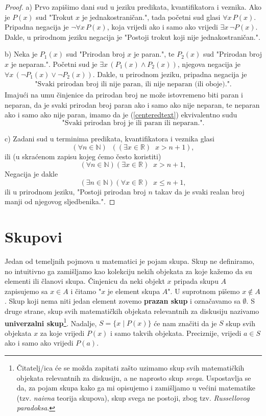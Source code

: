 \begin{proof}
a) Prvo zapišimo dani sud u jeziku predikata, kvantifikatora i veznika. Ako je \(P(x)\) sud "Trokut \(x\) je jednakostraničan.", tada početni sud glasi \(\forall{x}\, P(x)\). Pripadna negacija je \(\neg \forall{x}\, P(x)\), koja vrijedi ako i samo ako vrijedi $\exists{x}\,\neg P(x)$.
Dakle, u prirodnom jeziku negacija je "Postoji trokut koji nije jednakostraničan.".

b) Neka je \(P_1(x)\) sud "Prirodan broj \(x\) je paran.", te \(P_2(x)\) sud "Prirodan broj \(x\) je neparan.". Početni sud je \(\exists{x}\, \left(P_1(x)\wedge P_2(x)\right)\), njegova negacija je \(\forall{x}\, \left(\neg P_1(x)\vee \neg P_2(x)\right)\). Dakle, u prirodnom jeziku, pripadna negacija je
\begin{align}
\label{centeredtext}
\text{"Svaki prirodan broj ili nije paran, ili nije neparan (ili oboje).".}
\end{align}
Imajući na umu činjenice da prirodan broj ne može istovremeno biti paran i neparan, da je svaki prirodan broj paran ako i samo ako nije neparan, te neparan ako i samo ako nije paran, imamo da je (\ref{centeredtext}) ekvivalentno sudu 
\[
\text{"Svaki prirodan broj je ili paran ili neparan.".}
\]

c) Zadani sud u terminima predikata, kvantifikatora i veznika glasi
$$(\forall n\in \mathbb{N})\;\;\left((\exists x\in \mathbb{R})\;\; x>n+1\right),$$
ili (u skraćenom zapisu kojeg ćemo često koristiti)
$$(\forall n\in \mathbb{N})(\exists x\in \mathbb{R})\;\; x>n+1,$$
Negacija je dakle
$$(\exists n\in \mathbb{N})(\forall x\in \mathbb{R})\;\; x\leq n+1,$$
ili u prirodnom jeziku, "Postoji prirodan broj $n$ takav da je svaki realan broj manji od njegovog sljedbenika.".
\end{proof}

\section{Skupovi}
Jedan od temeljnih pojmova u matematici je pojam skupa. Skup ne
definiramo, no intuitivno ga zamišljamo kao kolekciju nekih objekata
za koje kažemo da su elementi ili članovi skupa.
Činjenicu da neki objekt \(x\) pripada skupu \(A\) zapisujemo sa \(x\in A\)
i čitamo "\(x\) je element skupa \(A\)". U suprotnom pišemo \(x\notin A\).
Skup koji nema niti jedan element zovemo \textbf{prazan skup} i označavamo sa \(\emptyset\). S druge strane, skup svih matematičkih objekata relevantnih za diskusiju nazivamo \textbf{univerzalni skup}\footnote{Čitatelj/ica će se možda zapitati zašto uzimamo skup svih matematičkih objekata relevantnih za diskusiju, a ne naprosto skup \textit{svega}. Uspostavlja se da, za pojam skupa kako ga mi opisujemo i zamišljamo u većini matematike (tzv. \textit{naivna} teorija skupova), skup svega ne postoji, zbog tzv. \textit{Russellovog paradoksa}.}. Nadalje, \(S=\{x\; |\; P(x)\}\) će nam značiti da je \(S\) skup svih objekata \(x\) za koje vrijedi \(P(x)\) i samo takvih objekata. Preciznije, vrijedi \(a\in S\) ako i samo ako vrijedi \(P(a)\). 

